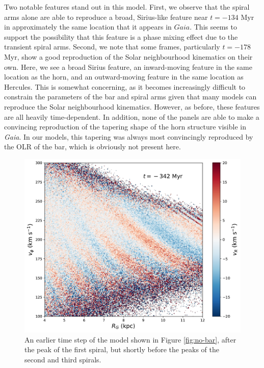 \documentclass[10pt]{article}
\begin{document}
Two notable features stand out in this model. First, we observe that the spiral arms alone are able to reproduce a broad, Sirius-like feature near $t = -134$ Myr in approximately the same location that it appears in $\textit{Gaia}$. This seems to support the possibility that this feature is a phase mixing effect due to the transient spiral arms. Second, we note that some frames, particularly $t = -178$ Myr, show a good reproduction of the Solar neighbourhood kinematics on their own. Here, we see a broad Sirius feature, an inward-moving feature in the same location as the horn, and an outward-moving feature in the same location as Hercules. This is somewhat concerning, as it becomes increasingly difficult to constrain the parameters of the bar and spiral arms given that many models can reproduce the Solar neighbourhood kinematics. However, as before, these features are all heavily time-dependent. In addition, none of the panels are able to make a convincing reproduction of the tapering shape of the horn structure visible in \textit{Gaia}. In our models, this tapering was always most convincingly reproduced by the OLR of the bar, which is obviously not present here.

\begin{figure}[h]
    \centering
    \includegraphics[width=\textwidth]{plots/single_spiral.pdf}
    \caption{An earlier time step of the model shown in Figure \ref{fig:no-bar}, after the peak of the first spiral, but shortly before the peaks of the second and third spirals.}
    \label{fig:single-spiral}
\end{figure}
\end{document}
